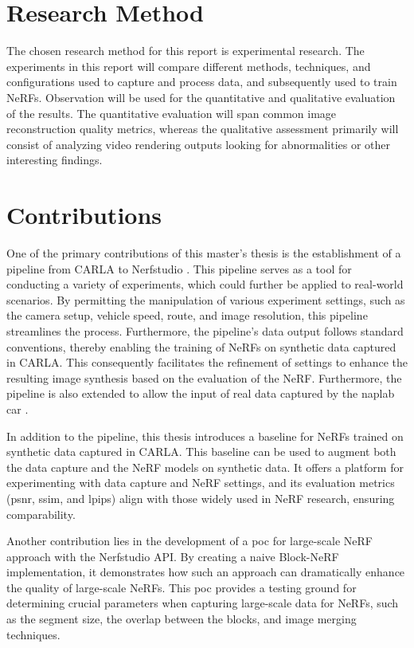\section{Research Method}
The chosen research method for this report is experimental research. The experiments in this report will compare different methods, techniques, and configurations used to capture and process data, and subsequently used to train NeRFs. Observation will be used for the quantitative and qualitative evaluation of the results. The quantitative evaluation will span common image reconstruction quality metrics, whereas the qualitative assessment primarily will consist of analyzing video rendering outputs looking for abnormalities or other interesting findings.







\section{Contributions}
One of the primary contributions of this master's thesis is the establishment of a pipeline from CARLA \cite{Dosovitskiy17} to Nerfstudio \cite{nerfstudio}. This pipeline serves as a tool for conducting a variety of experiments, which could further be applied to real-world scenarios. By permitting the manipulation of various experiment settings, such as the camera setup, vehicle speed, route, and image resolution, this pipeline streamlines the process. Furthermore, the pipeline's data output follows standard conventions, thereby enabling the training of NeRFs on synthetic data captured in CARLA. This consequently facilitates the refinement of settings to enhance the resulting image synthesis based on the evaluation of the NeRF. Furthermore, the pipeline is also extended to allow the input of real data captured by the \acrfull{naplab} car \cite{naplab}.

In addition to the pipeline, this thesis introduces a baseline for NeRFs trained on synthetic data captured in CARLA. This baseline can be used to augment both the data capture and the NeRF models on synthetic data. It offers a platform for experimenting with data capture and NeRF settings, and its evaluation metrics (\acrshort{psnr}, \acrshort{ssim}, and \acrshort{lpips}) align with those widely used in NeRF research, ensuring comparability.

Another contribution lies in the development of a \acrfull{poc} for large-scale NeRF approach with the Nerfstudio API. By creating a naive Block-NeRF implementation, it demonstrates how such an approach can dramatically enhance the quality of large-scale NeRFs. This \acrshort{poc} provides a testing ground for determining crucial parameters when capturing large-scale data for NeRFs, such as the segment size, the overlap between the blocks, and image merging techniques.

